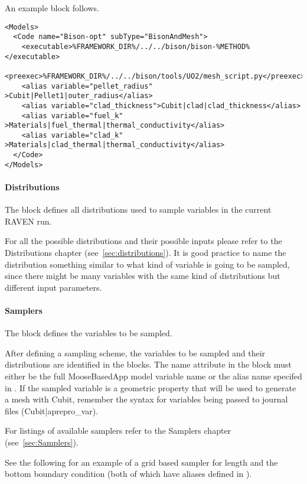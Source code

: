 An example  block follows.

\begin{lstlisting}[style=XML]
<Models>
  <Code name="Bison-opt" subType="BisonAndMesh">
    <executable>%FRAMEWORK_DIR%/../../bison/bison-%METHOD%</executable>
    <preexec>%FRAMEWORK_DIR%/../../bison/tools/UO2/mesh_script.py</preexec>
    <alias variable="pellet_radius" >Cubit|Pellet1|outer_radius</alias>
    <alias variable="clad_thickness">Cubit|clad|clad_thickness</alias>
    <alias variable="fuel_k"        >Materials|fuel_thermal|thermal_conductivity</alias>
    <alias variable="clad_k"        >Materials|clad_thermal|thermal_conductivity</alias>
  </Code>
</Models>
\end{lstlisting}

\paragraph{Distributions}
The  block defines all distributions used to
sample variables in the current RAVEN run.

For all the possible distributions and their possible inputs please
refer to the Distributions chapter (see~\ref{sec:distributions}).
%
It is good practice to name the distribution something similar to what kind of
variable is going to be sampled, since there might be many variables with the
same kind of distributions but different input parameters.

\paragraph{Samplers}
The  block defines the variables to be sampled.

After defining a sampling scheme, the variables to be sampled and
their distributions are identified in the  blocks.
The name attribute in the  block must either be the
full MooseBasedApp model variable name or the alias name specifed in
.  If the sampled variable is a geometric property
that will be used to generate a mesh with Cubit, remember the syntax for
variables being passed to journal files (Cubit|aprepro\_var).

For listings of available samplers
refer to the Samplers chapter (see~\ref{sec:Samplers}).

See the following for an example of a grid based sampler for
length and the bottom boundary condition (both of which have aliases
defined in ).

